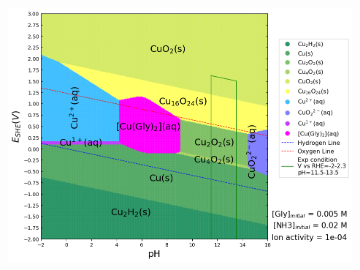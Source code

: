 \documentclass[journal=jacsat,manuscript=article]{achemso}
\begin{document}
\begin{figure}[htbp]
\begin{subfigure}[b]{0.3\textwidth}
        \par\medskip
    \end{subfigure}
    \begin{subfigure}[b]{0.3\textwidth}
        \subcaption{}\label{fig:Cu_Pourbaix_NH3_Gly}
        \includegraphics[width=\textwidth]{Figures/pourbaix_diagrams/Cu-NH3-H2O_activity=1e-04_[NH3]=0.02M_[Gly]=0.005M_[CN]=0.png}
        

\end{subfigure}
\end{figure}
\end{document}
